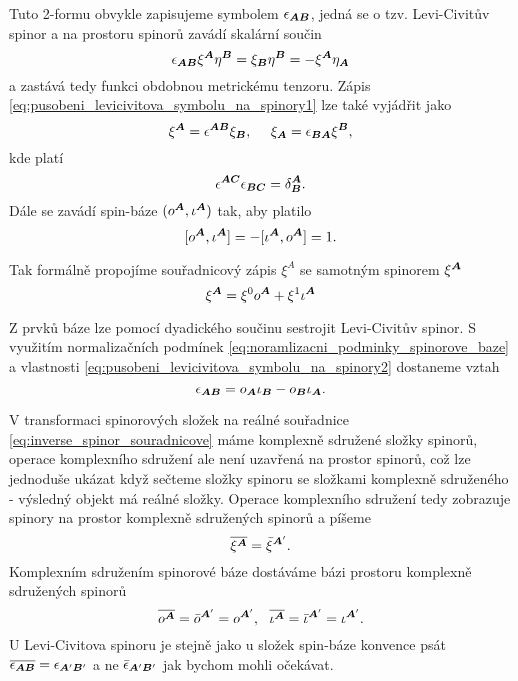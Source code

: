 Tuto 2-formu obvykle zapisujeme symbolem $\epsilon_{{\boldsymbol{A}} {\boldsymbol{B}}}$, jedná se o tzv. Levi-Civitův spinor a na prostoru
spinorů zavádí skalární součin
\begin{equation}
    \label{eq:pusobeni_levicivitova_symbolu_na_spinory1}
    \epsilon_{{\boldsymbol{A}} {\boldsymbol{B}}} \xi^{\boldsymbol{A}} \eta^{\boldsymbol{B}} = \xi_{\boldsymbol{B}} \eta^{\boldsymbol{B}} = -\xi^{\boldsymbol{A}}\eta_{\boldsymbol{A}}
\end{equation}
a zastává tedy funkci obdobnou metrickému tenzoru. Zápis \eqref{eq:pusobeni_levicivitova_symbolu_na_spinory1} lze
také vyjádřit jako
\begin{equation}
    \label{eq:pusobeni_levicivitova_symbolu_na_spinory2}
    \xi^{\boldsymbol{A}} = \epsilon^{{\boldsymbol{A}}{\boldsymbol{B}}} \xi_{\boldsymbol{B}}, ~~~~ \xi_{\boldsymbol{A}} = \epsilon_{{\boldsymbol{B}}{\boldsymbol{A}}} \xi^{\boldsymbol{B}},
\end{equation}
kde platí
\begin{equation}
    \epsilon^{{\boldsymbol{A}}{\boldsymbol{C}}} \epsilon_{{\boldsymbol{B}}{\boldsymbol{C}}} = \delta_{\boldsymbol{B}}^{\boldsymbol{A}}.
\end{equation}
Dále se zavádí spin-báze $(o^{\boldsymbol{A}}, \iota^{\boldsymbol{A}})$ tak, aby platilo
\begin{equation}
    \label{eq:noramlizacni_podminky_spinorove_baze}
    [o^{\boldsymbol{A}}, \iota^{\boldsymbol{A}}] = -[\iota^{\boldsymbol{A}}, o^{\boldsymbol{A}}] = 1.
\end{equation}

Tak formálně propojíme souřadnicový zápis $\xi^A$ se samotným spinorem $\xi^{\boldsymbol{A}}$
\begin{equation}
    \xi^{\boldsymbol{A}} = \xi^0 o^{\boldsymbol{A}} + \xi^1 \iota^{\boldsymbol{A}}
\end{equation}

Z prvků báze lze pomocí dyadického součinu sestrojit Levi-Civitův spinor. S využitím normalizačních podmínek
\eqref{eq:noramlizacni_podminky_spinorove_baze} a vlastnosti \eqref{eq:pusobeni_levicivitova_symbolu_na_spinory2}
dostaneme vztah
\begin{equation}
    \epsilon_{{\boldsymbol{A}}{\boldsymbol{B}}} = o_{\boldsymbol{A}} \iota_{\boldsymbol{B}} - o_{\boldsymbol{B}} \iota_{\boldsymbol{A}}.
\end{equation}

V transformaci spinorových složek na reálné souřadnice \eqref{eq:inverse_spinor_souradnicove} máme komplexně
sdružené složky spinorů, operace komplexního sdružení ale není uzavřená na prostor spinorů, což lze jednoduše
ukázat když sečteme složky spinoru se složkami komplexně sdruženého - výsledný objekt má reálné složky.
Operace komplexního sdružení tedy zobrazuje spinory na prostor komplexně sdružených spinorů a píšeme
\begin{equation}
    \overline{\xi^{\boldsymbol{A}}} = \bar{\xi}^{{\boldsymbol{A}}'}.
\end{equation}
Komplexním sdružením spinorové báze dostáváme bázi prostoru komplexně sdružených spinorů
\begin{equation}
    \overline{o^{\boldsymbol{A}}} = \bar{o}^{{\boldsymbol{A}}'} = o^{{\boldsymbol{A}}'}, ~~ \overline{\iota^{{\boldsymbol{A}}}} = \bar{\iota}^{{\boldsymbol{A}}'} = \iota^{{\boldsymbol{A}}'}.
\end{equation}
U Levi-Civitova spinoru je stejně jako u složek spin-báze konvence psát $\overline{\epsilon_{{\boldsymbol{A}}{\boldsymbol{B}}}} = \epsilon_{{\boldsymbol{A}}'{\boldsymbol{B}}'}$ a ne 
$\bar{\epsilon}_{{\boldsymbol{A}}'{\boldsymbol{B}}'}$ jak bychom mohli očekávat.

